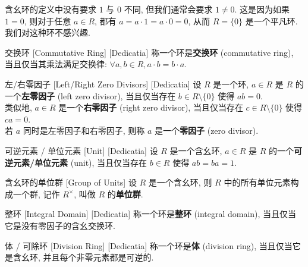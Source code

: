         \begin{rmk}
            [Dedicatia]
            含幺环的定义中没有要求 \(1\) 与 \(0\) 不同, 但我们通常会要求 \(1\neq 0\). 这是因为如果 \(1=0\), 则对于任意 \(a\in R\), 都有 \(a=a\cdot 1=a\cdot 0=0\), 从而 \(R=\{0\}\) 是一个平凡环. 我们对这种环不感兴趣.
        \end{rmk}

        \begin{dfn}
            {交换环}
            [Commutative Ring]
            [Dedicatia]
            称一个环是\textbf{交换环} (commutative ring), 当且仅当其乘法满足交换律: \(\forall a,b\in R, a\cdot b=b\cdot a\).
        \end{dfn}

        \begin{dfn}
            {左/右零因子}
            [Left/Right Zero Divisors]
            [Dedicatia]
            设 \(R\) 是一个环, \(a\in R\) 是 \(R\) 的一个\textbf{左零因子} (left zero divisor), 当且仅当存在 \(b\in R\setminus\{0\}\) 使得 \(ab=0\). \\
            类似地, \(a\in R\) 是一个\textbf{右零因子} (right zero divisor), 当且仅当存在 \(c\in R\setminus\{0\}\) 使得 \(ca=0\).\\
            若 \(a\) 同时是左零因子和右零因子, 则称 \(a\) 是一个\textbf{零因子} (zero divisor).
        \end{dfn}

        \begin{dfn}
            {可逆元素 / 单位元素}
            [Unit]
            [Dedicatia]
            设 \(R\) 是一个含幺环, \(a\in R\) 是 \(R\) 的一个\textbf{可逆元素/单位元素} (unit), 当且仅当存在 \(b\in R\) 使得 \(ab=ba=1\).
        \end{dfn}

        \begin{dfn}
            {含幺环的单位群}
            [Group of Units]
            设 \(R\) 是一个含幺环, 则 \(R\) 中的所有单位元素构成一个群, 记作 \(R^\times\), 叫做 \(R\) 的\textbf{单位群}.
        \end{dfn}

        \begin{dfn}
            {整环}
            [Integral Domain]
            [Dedicatia]
            称一个环是\textbf{整环} (integral domain), 当且仅当它是没有零因子的含幺交换环.
        \end{dfn}

        \begin{dfn}
            {体 / 可除环}
            [Division Ring]
            [Dedicatia]
            称一个环是\textbf{体} (division ring), 当且仅当它是含幺环, 并且每个非零元素都是可逆的.
        \end{dfn}

